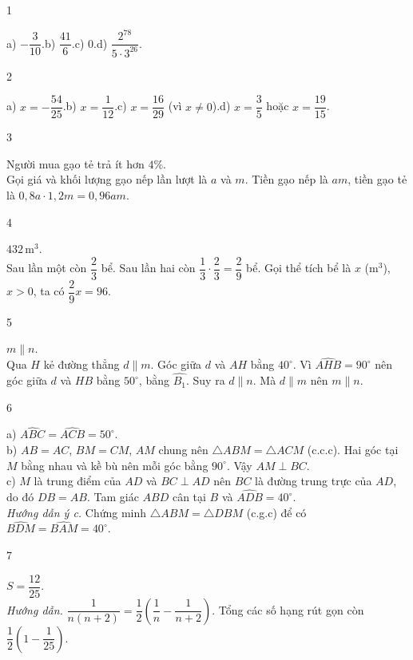 \begin{Solbook}{1}
 \par \noindent  a) $-\dfrac {3}{10}$.\quad b) $\dfrac {41}{6}$.\quad c) $0$.\quad d) $\dfrac {2^{78}}{5\cdot 3^{26}}$.  \hfill \qedEX 
\end{Solbook}
\begin{Solbook}{2}
 \par \noindent  a) $x=-\dfrac {54}{25}$.\quad b) $x=\dfrac {1}{12}$.\quad c) $x=\dfrac {16}{29}$ (vì $x\neq 0$).\quad d) $x=\dfrac {3}{5}$ hoặc $x=\dfrac {19}{15}$.  \hfill \qedEX 
\end{Solbook}
\begin{Solbook}{3}
 \par \noindent  Người mua gạo tẻ trả ít hơn $4\%$.\\ Gọi giá và khối lượng gạo nếp lần lượt là $a$ và $m$. Tiền gạo nếp là $am$, tiền gạo tẻ là $0{,}8a\cdot 1{,}2m=0{,}96am$.  \hfill \qedEX 
\end{Solbook}
\begin{Solbook}{4}
 \par \noindent  $432\,\mathrm {m}^{3}$.\\ Sau lần một còn $\dfrac {2}{3}$ bể. Sau lần hai còn $\dfrac {1}{3}\cdot \dfrac {2}{3}=\dfrac {2}{9}$ bể. Gọi thể tích bể là $x$ ($\mathrm {m}^{3}$), $x>0$, ta có $\dfrac {2}{9}x=96$.  \hfill \qedEX 
\end{Solbook}
\begin{Solbook}{5}
 \par \noindent  $m\parallel n$.\\ Qua $H$ kẻ đường thẳng $d\parallel m$. Góc giữa $d$ và $AH$ bằng $40^{\circ }$. Vì $\widehat {AHB}=90^{\circ }$ nên góc giữa $d$ và $HB$ bằng $50^{\circ }$, bằng $\widehat {B_{1}}$. Suy ra $d\parallel n$. Mà $d\parallel m$ nên $m\parallel n$.  \hfill \qedEX 
\end{Solbook}
\begin{Solbook}{6}
 \par \noindent  a) $\widehat {ABC}=\widehat {ACB}=50^{\circ }$.\\ b) $AB=AC$, $BM=CM$, $AM$ chung nên $\triangle ABM=\triangle ACM$ (c.c.c). Hai góc tại $M$ bằng nhau và kề bù nên mỗi góc bằng $90^{\circ }$. Vậy $AM\perp BC$.\\ c) $M$ là trung điểm của $AD$ và $BC\perp AD$ nên $BC$ là đường trung trực của $AD$, do đó $DB=AB$. Tam giác $ABD$ cân tại $B$ và $\widehat {ADB}=40^{\circ }$.\\ \textit {Hướng dẫn ý c.} Chứng minh $\triangle ABM=\triangle DBM$ (c.g.c) để có $\widehat {BDM}=\widehat {BAM}=40^{\circ }$.  \hfill \qedEX 
\end{Solbook}
\begin{Solbook}{7}
 \par \noindent  $S=\dfrac {12}{25}$.\\ \textit {Hướng dẫn.} $\dfrac {1}{n(n+2)}=\dfrac {1}{2}\left (\dfrac {1}{n}-\dfrac {1}{n+2}\right )$. Tổng các số hạng rút gọn còn $\dfrac {1}{2}\left (1-\dfrac {1}{25}\right )$.  \hfill \qedEX 
\end{Solbook}
